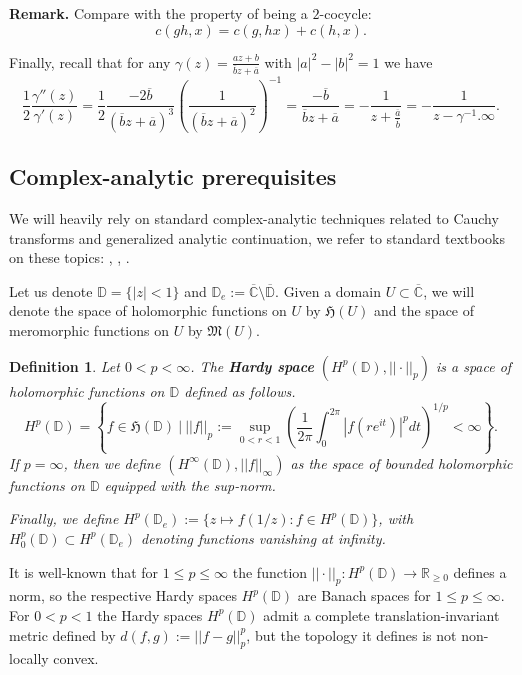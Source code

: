 \documentclass[11pt]{article}
\newtheorem{definition}{Definition}[section]
\begin{document}
\textbf{Remark.} Compare with the property of being a $2$-cocycle:
\[
c(gh, x) = c(g, hx) + c(h, x).
\]

Finally, recall that for any $\gamma(z) = \frac{a z + b}{\overline{b} z + \overline{a}}$ with $|a|^2 - |b|^2 = 1$ we have
\begin{equation}
	\label{poles of the log derivative}
		\frac{1}{2} \frac{\gamma''(z)}{\gamma'(z)} = \frac{1}{2} \frac{-2\overline{b}}{(\overline{b}z + \overline{a})^3} \left( \frac{1}{(\overline{b}z + \overline{a})^2}\right)^{-1} = \frac{- \overline{b}}{\overline{b}z + \overline{a}} = - \frac{1}{z + \frac{\overline{a}}{\overline{b}}} = - \frac{1}{z - \gamma^{-1}.\infty}.
\end{equation}

\subsection{Complex-analytic prerequisites}
We will heavily rely on standard complex-analytic techniques related to Cauchy transforms and generalized analytic continuation, we refer to standard textbooks on these topics: \cite{Shapiro1968}, \cite{cimahardy}, \cite{book:738388}.

Let us denote $\mathbb{D} = \{ |z| < 1 \}$ and $\mathbb{D}_e := \overline{\mathbb{C}} \setminus \overline{\mathbb{D}}$. Given a domain $U \subset \overline{\mathbb{C}}$, we will denote the space of holomorphic functions on $U$ by $\mathfrak{H}(U)$ and the space of meromorphic functions on $U$ by $\mathfrak{M}(U)$.

\begin{definition}
	Let $0 < p < \infty$. The \textbf{Hardy space} $(H^p(\mathbb{D}), || \cdot ||_p)$ is a space of holomorphic functions on $\mathbb{D}$ defined as follows.
	\[
	H^p(\mathbb{D}) = \left\lbrace  f \in \mathfrak{H}(\mathbb{D}) \ | \ ||f||_p := \sup_{0 < r < 1} \left( \frac{1}{2 \pi} \int_{0}^{2 \pi} |f(r e^{it})|^p dt \right)^{1/p} < \infty \right\rbrace.
	\] 
	If $p = \infty$, then we define $(H^\infty(\mathbb{D}), ||f||_\infty)$ as the space of bounded holomorphic functions on $\mathbb{D}$ equipped with the sup-norm.
	
	Finally, we define $H^p(\mathbb{D}_e) := \{ z \mapsto f(1/z) : f \in H^p(\mathbb{D})\}$, with $H^p_0(\mathbb{D}) \subset H^p(\mathbb{D}_e)$ denoting functions vanishing at infinity.
\end{definition} 

It is well-known that for $1 \le p \le \infty$ the function $||\cdot||_p : H^p(\mathbb{D}) \rightarrow \mathbb{R}_{\ge 0}$ defines a norm, so the respective Hardy spaces $H^p(\mathbb{D})$ are Banach spaces for $1 \le p \le \infty$. For $0 < p < 1$ the Hardy spaces $H^p(\mathbb{D})$ admit a complete translation-invariant metric defined by $d(f, g) := ||f - g||^p_p$, but the topology it defines is not non-locally convex.
\end{document}
